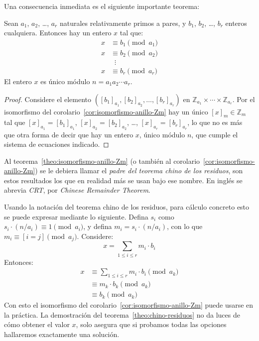   Una consecuencia inmediata es el siguiente importante teorema:
  \begin{theorem}
    \label{theo:chino-residuos}
    Sean \(a_1\), \(a_2\), \ldots, \(a_r\)
    naturales relativamente primos a pares,
    y \(b_1\), \(b_2\), \ldots, \(b_r\) enteros cualquiera.
    Entonces hay un entero \(x\) tal que:
    \begin{align*}
      x &\equiv b_1 \pmod{a_1} \\
      x &\equiv b_2 \pmod{a_2} \\
	&\;\;\vdots	       \\
      x &\equiv b_r \pmod{a_r}
    \end{align*}
    El entero \(x\) es único módulo \(n = a_1 a_2 \dotsm a_r\).
  \end{theorem}
  \begin{proof}
    Considere el elemento
    \(([b_1]_{a_1}, [b_2]_{a_2}, \dotsc,
       [b_r]_{a_r})\)
    en
    \(\mathbb{Z}_{a_1} \times \dotsb \times \mathbb{Z}_{a_r}\).
    Por el isomorfismo del corolario~\ref{cor:isomorfismo-anillo-Zm}
    hay un único \([x]_m \in \mathbb{Z}_m\)
    tal que \([x]_{a_1} = [b_1]_{a_1}\),
    \([x]_{a_2} = [b_2]_{a_2}\), \ldots,
    \([x]_{a_r} = [b_r]_{a_r}\),
    lo que no es más que otra forma
    de decir que hay un entero \(x\),
    único módulo \(n\),
    que cumple el sistema de ecuaciones indicado.
  \end{proof}
  Al teorema~\ref{theo:isomorfismo-anillo-Zm}
  (o también al corolario~\ref{cor:isomorfismo-anillo-Zm})
  se le debiera llamar
  el \emph{padre del teorema chino de los residuos},%
  son estos resultados los que en realidad más se usan
  bajo ese nombre.
  En inglés se abrevia \emph{CRT},
  por \emph{\foreignlanguage{english}{Chinese Remainder Theorem}}.%

  Usando la notación del teorema chino de los residuos,
  para cálculo concreto
  esto se puede expresar mediante lo siguiente.
  Defina \(s_i\) como
  \(s_i \cdot (n / a_i) \equiv 1 \pmod{a_i}\),
  y defina \(m_i = s_i \cdot (n / a_i)\),
  con lo que \(m_i \equiv [i = j] \pmod{a_j}\).
  Considere:
  \begin{equation*}
    x = \sum_{1 \le i \le r} m_i \cdot b_i
  \end{equation*}
  Entonces:
  \begin{align*}
    x
      &\equiv \sum_{1 \le i \le r} m_i \cdot b_i \pmod{a_k} \\
      &\equiv m_k \cdot b_k			 \pmod{a_k} \\
      &\equiv b_k				 \pmod{a_k}
  \end{align*}
  Con esto el isomorfismo
  del corolario~\ref{cor:isomorfismo-anillo-Zm}
  puede usarse en la práctica.
  La demostración del teorema~\ref{theo:chino-residuos}
  no da luces de cómo obtener el valor \(x\),
  solo asegura que si probamos todas las opciones
  hallaremos exactamente una solución.


